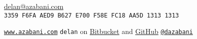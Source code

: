 \documentclass[a4paper,12pt]{article}
\begin{document}
\hrulefill

\hspace{5mm}\begin{minipage}{110mm}
	                    \href{mailto:delan@azabani.com}{\Huge{delan\textcolor{lg}{@}azabani\textcolor{lg}{.com}}}
	\vspace{0.5em}  \\  {\texttt{\textcolor{lg}{3359 F6FA AED9 B627 E700 F58E FC18 AA5D 1313 1313}}}
\end{minipage}\hfill\begin{minipage}{50mm}
\end{minipage}\hspace{5mm}

\hrulefill

\vspace{-1ex}\hspace{5mm}\begin{minipage}{160mm}%
	\texttt{\href{https://www.azabani.com/}{www.azabani.com}}
	\hfill
	\texttt{delan} on
	\href{https://bitbucket.org/delan/}{Bitbucket} and
	\href{https://github.com/delan}{GitHub}
	\hfill
	\texttt{\href{https://twitter.com/dazabani}{@dazabani}}
\end{minipage}\hspace{5mm}\vspace{-2ex}

\hrulefill

\vspace{1em}
\end{document}
